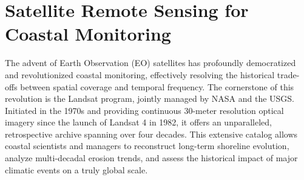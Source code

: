 ﻿\documentclass[ENG]{TFUOC}%
\begin{document}
\begin{table}[H]
    \centering
    \caption{Summary of common coastal monitoring methods and their key characteristics.}
    \vspace{0.1cm}
    \renewcommand{\arraystretch}{1.5}
    \label{tab:monitoring_methods}
\end{table}

\section{Satellite Remote Sensing for Coastal Monitoring} \label{sec:soa_satellite_methods}

The advent of Earth Observation (EO) satellites has profoundly democratized and revolutionized coastal monitoring, effectively resolving the historical trade-offs between spatial coverage and temporal frequency. The cornerstone of this revolution is the Landsat program, jointly managed by NASA and the USGS. Initiated in the 1970s and providing continuous 30-meter resolution optical imagery since the launch of Landsat 4 in 1982, it offers an unparalleled, retrospective archive spanning over four decades. This extensive catalog allows coastal scientists and managers to reconstruct long-term shoreline evolution, analyze multi-decadal erosion trends, and assess the historical impact of major climatic events on a truly global scale.
\end{document}
